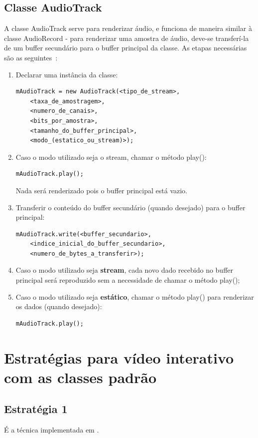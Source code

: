 \documentclass{acm_proc_article-sp}
\begin{document}
\subsection{Classe AudioTrack}\label{audio_track}
A classe AudioTrack serve para renderizar áudio, e funciona de maneira similar à classe AudioRecord - para renderizar uma amostra de áudio, deve-se transferí-la de um buffer secundário para o buffer principal da classe. As etapas necessárias são as seguintes~\cite{developers_android}:
\begin{enumerate}
 \item Declarar uma instância da classe:
  \begin{lstlisting}
mAudioTrack = new AudioTrack(<tipo_de_stream>,
    <taxa_de_amostragem>,
    <numero_de_canais>,
    <bits_por_amostra>,
    <tamanho_do_buffer_principal>,
    <modo_(estatico_ou_stream)>);
  \end{lstlisting}
 \item Caso o modo utilizado seja o stream, chamar o método play():
  \begin{lstlisting}
mAudioTrack.play();
  \end{lstlisting}
  Nada será renderizado pois o buffer principal está vazio.
 \item Transferir o conteúdo do buffer secundário (quando desejado) para o buffer principal:
  \begin{lstlisting}
mAudioTrack.write(<buffer_secundario>,
    <indice_inicial_do_buffer_secundario>,
    <numero_de_bytes_a_transferir>);
  \end{lstlisting}
 \item Caso o modo utilizado seja \textbf{stream}, cada novo dado recebido no buffer principal será reproduzido sem a necessidade de chamar o método play();
 \item Caso o modo utilizado seja \textbf{estático}, chamar o método play() para renderizar os dados (quando desejado):
  \begin{lstlisting}
mAudioTrack.play();
  \end{lstlisting}
\end{enumerate}

\section{Estratégias para vídeo interativo com as classes padrão}

\subsection{Estratégia 1}
É a técnica implementada em \cite{trab_alemao}.
\end{document}
